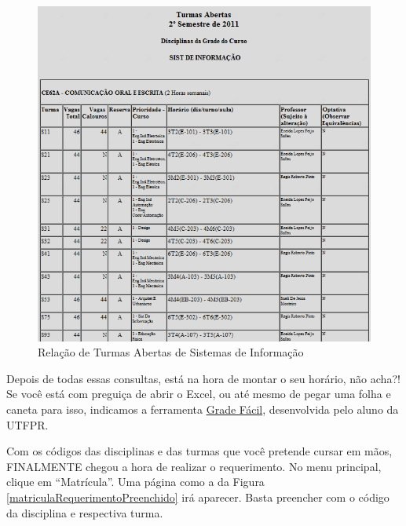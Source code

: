 \documentclass[a4paper,12pt,openany]{article}
\begin{document}
	\begin{figure}[ht!]  \centering
		\includegraphics[scale=0.5]{Turmas_Abertas_Tabela.png}
		\caption{Relação de Turmas Abertas de Sistemas de Informação}
		\label{turmasAbertasTabela}
	\end{figure}

Depois de todas essas consultas, está na hora de montar o seu horário, não acha?! Se você está com preguiça de abrir o Excel, ou até mesmo de pegar uma folha e caneta para isso, indicamos a ferramenta \href{http://www.caiux.net/utfpr/}{Grade Fácil}, desenvolvida pelo aluno  da UTFPR.

Com os códigos das disciplinas e das turmas que você pretende cursar em mãos, FINALMENTE chegou a hora de realizar o requerimento. No menu principal, clique em ``Matrícula''. Uma página como a da Figura \ref{matriculaRequerimentoPreenchido} irá aparecer. Basta preencher com o código da disciplina e respectiva turma.
\end{document}
